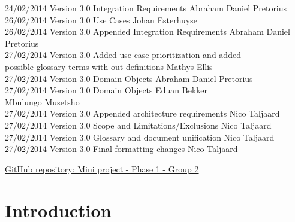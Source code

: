 \documentclass[12pt]{article}
\begin{document}
\begin{tabbing}
			24/02/2014	\> Version 3.0	\> Integration Requirements						\> Abraham Daniel Pretorius \\
			26/02/2014	\> Version 3.0 	\> Use Cases									\> Johan Esterhuyse \\	
			26/02/2014	\> Version 3.0 	\> Appended Integration Requirements			\> Abraham Daniel Pretorius \\
			27/02/2014	\> Version 3.0	\> Added use case prioritization and added		\> \\
						\>				\> possible glossary terms with out definitions	\> Mathys Ellis \\
			27/02/2014	\> Version 3.0	\> Domain Objects								\> Abraham Daniel Pretorius \\
			27/02/2014	\> Version 3.0	\> Domain Objects								\> Eduan Bekker \\
						\>				\>												\> Mbulungo Musetsho \\
			27/02/2014	\> Version 3.0	\> Appended architecture requirements			\> Nico Taljaard \\
			27/02/2014	\> Version 3.0	\> Scope and Limitations/Exclusions				\> Nico Taljaard \\
			27/02/2014	\> Version 3.0	\> Glossary and document unification			\> Nico Taljaard \\
			27/02/2014	\> Version 3.0	\> Final formatting changes						\> Nico Taljaard \\
		\end{tabbing}

	\newpage
	\tableofcontents
	
	\vspace{0.5in}
	
	\begin{flushleft}
		\LARGE\href{https://github.com/njTaljaard/Cos301_Phase1/}{GitHub repository: Mini project - Phase 1 -  Group 2}
	\end{flushleft}
	
	\newpage
	\section{Introduction}
	
		\vspace{0.2in}
	
\end{document}
